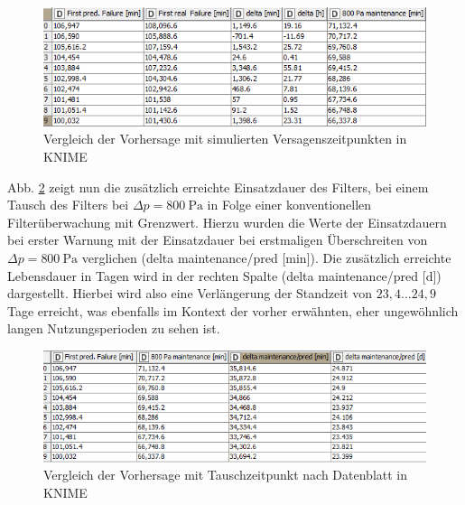     \begin{figure}[h]
        \begin{center}
            \includegraphics[width=1.1\linewidth]{images/knime_results1.png}
            \caption[KNIME Vergleich Vorhersage mit Simulationswerten]{Vergleich der Vorhersage mit simulierten Versagenszeitpunkten in KNIME}
            \label{fi:knime_results1}
        \end{center}
    \end{figure}
    
    Abb. \ref{fi:knime_results2} zeigt nun die zusätzlich erreichte Einsatzdauer des Filters, bei einem Tausch des Filters bei $\Delta p=\SI{800}{\pascal}$ in Folge einer konventionellen Filterüberwachung mit Grenzwert. Hierzu wurden die Werte der Einsatzdauern bei erster Warnung mit der Einsatzdauer bei erstmaligen Überschreiten von $\Delta p=\SI{800}{\pascal}$ verglichen (delta maintenance/pred [min]). Die zusätzlich erreichte Lebensdauer in Tagen wird in der rechten Spalte (delta maintenance/pred [d]) dargestellt. Hierbei wird also eine Verlängerung der Standzeit von $ 23,4...24,9$ Tage erreicht, was ebenfalls im Kontext der vorher erwähnten, eher ungewöhnlich langen Nutzungsperioden zu sehen ist.
    \begin{figure}[h]
        \begin{center}
            \includegraphics[width=1.1\linewidth]{images/knime_results2.png}
            \caption[KNIME Zeitgewinn durch Vorhersage]{Vergleich der Vorhersage mit Tauschzeitpunkt nach Datenblatt in KNIME}
            \label{fi:knime_results2}
        \end{center}
    \end{figure}
